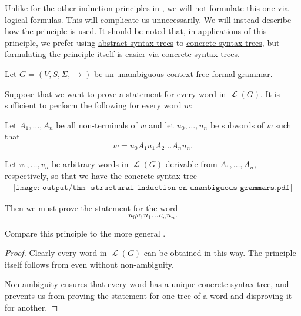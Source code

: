\begin{theorem}\label{thm:structural_induction_on_unambiguous_grammars}\mimprovised
  Unlike for the other induction principles in , we will not formulate this one via logical formulas. This will complicate us unnecessarily. We will instead describe how the principle is used. It should be noted that, in applications of this principle, we prefer using \hyperref[rem:abstract_syntax_tree]{abstract syntax trees} to \hyperref[def:concrete_syntax_tree]{concrete syntax trees}, but formulating the principle itself is easier via concrete syntax trees.

  Let \( G = (V, S, \Sigma, \to) \) be an \hyperref[def:chomsky_hierarchy/context_free]{unambiguous} \hyperref[def:chomsky_hierarchy/context_free]{context-free} \hyperref[def:formal_grammar]{formal grammar}.

  Suppose that we want to prove a statement for every word in \( \mscrL(G) \). It is sufficient to perform the following for every word \( w \):
  \begin{displayquote}
    Let \( A_1, \ldots, A_n \) be all non-terminals of \( w \) and let \( u_0, \ldots, u_n \) be subwords of \( w \) such that
    \begin{equation*}
      w = u_0 A_1 u_1 A_2 \ldots A_n u_n.
    \end{equation*}

    Let \( v_1, \ldots, v_n \) be arbitrary words in \( \mscrL(G) \) derivable from \( A_1, \ldots, A_n \), respectively, so that we have the concrete syntax tree
    \begin{equation*}
      \begin{aligned}
        \texttt{[image: output/thm\_\_structural\_induction\_on\_unambiguous\_grammars.pdf]}
      \end{aligned}
    \end{equation*}

    Then we must prove the statement for the word
    \begin{equation*}
      u_0 v_1 u_1 \ldots v_n u_n.
    \end{equation*}
  \end{displayquote}

  Compare this principle to the more general .
\end{theorem}
\begin{proof}
  Clearly every word in \( \mscrL(G) \) can be obtained in this way. The principle itself follows from  even without non-ambiguity.

  Non-ambiguity ensures that every word has a unique concrete syntax tree, and prevents us from proving the statement for one tree of a word and disproving it for another.
\end{proof}

